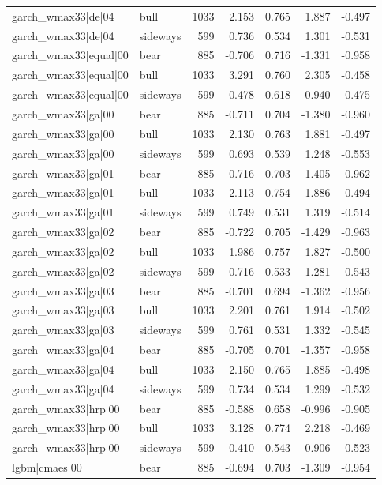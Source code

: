 \begin{table}
\begin{tabular}{llrrrrr}
garch\_wmax33|de|04 & bull & 1033 & 2.153 & 0.765 & 1.887 & -0.497 \\
garch\_wmax33|de|04 & sideways & 599 & 0.736 & 0.534 & 1.301 & -0.531 \\
garch\_wmax33|equal|00 & bear & 885 & -0.706 & 0.716 & -1.331 & -0.958 \\
garch\_wmax33|equal|00 & bull & 1033 & 3.291 & 0.760 & 2.305 & -0.458 \\
garch\_wmax33|equal|00 & sideways & 599 & 0.478 & 0.618 & 0.940 & -0.475 \\
garch\_wmax33|ga|00 & bear & 885 & -0.711 & 0.704 & -1.380 & -0.960 \\
garch\_wmax33|ga|00 & bull & 1033 & 2.130 & 0.763 & 1.881 & -0.497 \\
garch\_wmax33|ga|00 & sideways & 599 & 0.693 & 0.539 & 1.248 & -0.553 \\
garch\_wmax33|ga|01 & bear & 885 & -0.716 & 0.703 & -1.405 & -0.962 \\
garch\_wmax33|ga|01 & bull & 1033 & 2.113 & 0.754 & 1.886 & -0.494 \\
garch\_wmax33|ga|01 & sideways & 599 & 0.749 & 0.531 & 1.319 & -0.514 \\
garch\_wmax33|ga|02 & bear & 885 & -0.722 & 0.705 & -1.429 & -0.963 \\
garch\_wmax33|ga|02 & bull & 1033 & 1.986 & 0.757 & 1.827 & -0.500 \\
garch\_wmax33|ga|02 & sideways & 599 & 0.716 & 0.533 & 1.281 & -0.543 \\
garch\_wmax33|ga|03 & bear & 885 & -0.701 & 0.694 & -1.362 & -0.956 \\
garch\_wmax33|ga|03 & bull & 1033 & 2.201 & 0.761 & 1.914 & -0.502 \\
garch\_wmax33|ga|03 & sideways & 599 & 0.761 & 0.531 & 1.332 & -0.545 \\
garch\_wmax33|ga|04 & bear & 885 & -0.705 & 0.701 & -1.357 & -0.958 \\
garch\_wmax33|ga|04 & bull & 1033 & 2.150 & 0.765 & 1.885 & -0.498 \\
garch\_wmax33|ga|04 & sideways & 599 & 0.734 & 0.534 & 1.299 & -0.532 \\
garch\_wmax33|hrp|00 & bear & 885 & -0.588 & 0.658 & -0.996 & -0.905 \\
garch\_wmax33|hrp|00 & bull & 1033 & 3.128 & 0.774 & 2.218 & -0.469 \\
garch\_wmax33|hrp|00 & sideways & 599 & 0.410 & 0.543 & 0.906 & -0.523 \\
lgbm|cmaes|00 & bear & 885 & -0.694 & 0.703 & -1.309 & -0.954 \\

\end{tabular}
\end{table}
